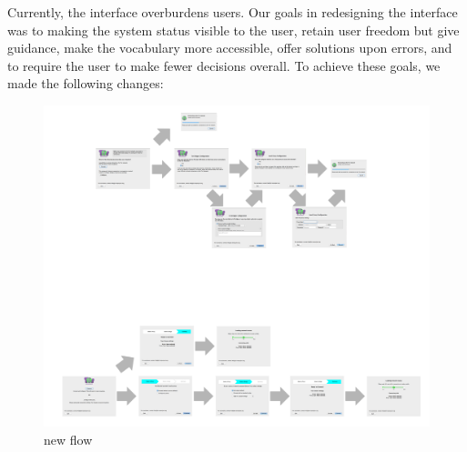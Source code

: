 \documentclass[USenglish,oneside,twocolumn]{article}
\begin{document}
Currently, the interface overburdens users. Our goals in redesigning the interface was to making the system status visible to the user, retain user freedom but give guidance, make the vocabulary more accessible, offer solutions upon errors, and to require the user to make fewer decisions overall. To achieve these goals, we made the following changes: \\

\begin{figure}[t]
	\centering
		\includegraphics[width=1.0\textwidth]{new-flow.pdf} 
		\caption{new flow} 
\end{figure} 
\end{document}
